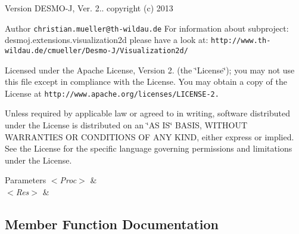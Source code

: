 \begin{DoxyVersion}{Version}
D\-E\-S\-M\-O-\/\-J, Ver. 2.. copyright (c) 2013 
\end{DoxyVersion}
\begin{DoxyAuthor}{Author}
{\tt christian.\-mueller@th-\/wildau.\-de} For information about subproject\-: desmoj.\-extensions.\-visualization2d please have a look at\-: {\tt http\-://www.\-th-\/wildau.\-de/cmueller/\-Desmo-\/\-J/\-Visualization2d/}
\end{DoxyAuthor}
Licensed under the Apache License, Version 2. (the \char`\"{}\-License\char`\"{}); you may not use this file except in compliance with the License. You may obtain a copy of the License at {\tt http\-://www.\-apache.\-org/licenses/\-L\-I\-C\-E\-N\-S\-E-\/2.}

Unless required by applicable law or agreed to in writing, software distributed under the License is distributed on an \char`\"{}\-A\-S I\-S\char`\"{} B\-A\-S\-I\-S, W\-I\-T\-H\-O\-U\-T W\-A\-R\-R\-A\-N\-T\-I\-E\-S O\-R C\-O\-N\-D\-I\-T\-I\-O\-N\-S O\-F A\-N\-Y K\-I\-N\-D, either express or implied. See the License for the specific language governing permissions and limitations under the License.


\begin{DoxyParams}{Parameters}
{\em $<$\-Proc$>$} & \\
\hline
{\em $<$\-Res$>$} & \\
\hline
\end{DoxyParams}


\subsection{Member Function Documentation}

